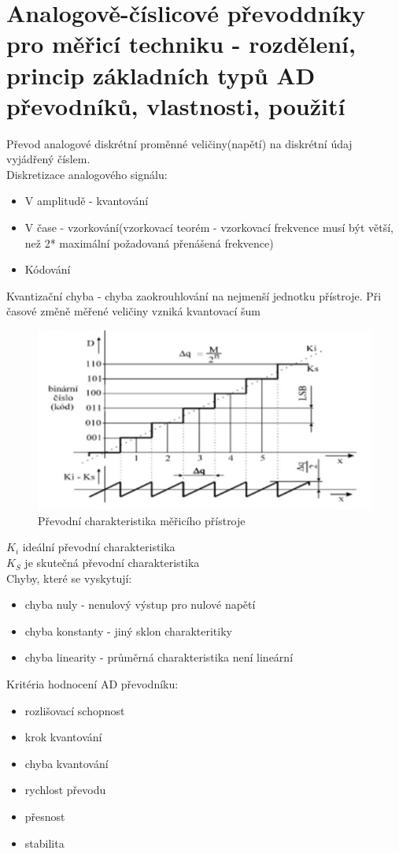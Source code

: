 \section{Analogově-číslicové převoddníky pro měřicí techniku - rozdělení, princip základních typů AD převodníků, vlastnosti, použití}
Převod analogové diskrétní proměnné veličiny(napětí) na diskrétní údaj vyjádřený číslem.\\
Diskretizace analogového signálu:
\begin{itemize}
    \item V amplitudě - kvantování
    \item V čase - vzorkování(vzorkovací teorém - vzorkovací frekvence musí být větší, než 2* maximální požadovaná přenášená frekvence)
    \item Kódování
\end{itemize}
Kvantizační chyba - chyba zaokrouhlování na nejmenší jednotku přístroje. Při časové změně měřené veličiny vzniká kvantovací šum\\
\begin{figure}[H]
    \centering
    \includegraphics*[scale = 1]{images/adc_prevodni_char.png}
    \caption*{Převodní charakteristika měřicího přístroje}
\end{figure}
$K_i$ ideální převodní charakteristika\\
$K_S$ je skutečná převodní charakteristika\\
Chyby, které se vyskytují:
\begin{itemize}
    \item chyba nuly - nenulový výstup pro nulové napětí
    \item chyba konstanty - jiný sklon charakteritiky
    \item chyba linearity - průměrná charakteristika není lineární
\end{itemize}
\newpage
Kritéria hodnocení AD převodníku:
\begin{itemize}
    \item rozlišovací schopnost
    \item krok kvantování
    \item chyba kvantování
    \item rychlost převodu
    \item přesnost
    \item stabilita
\end{itemize}
